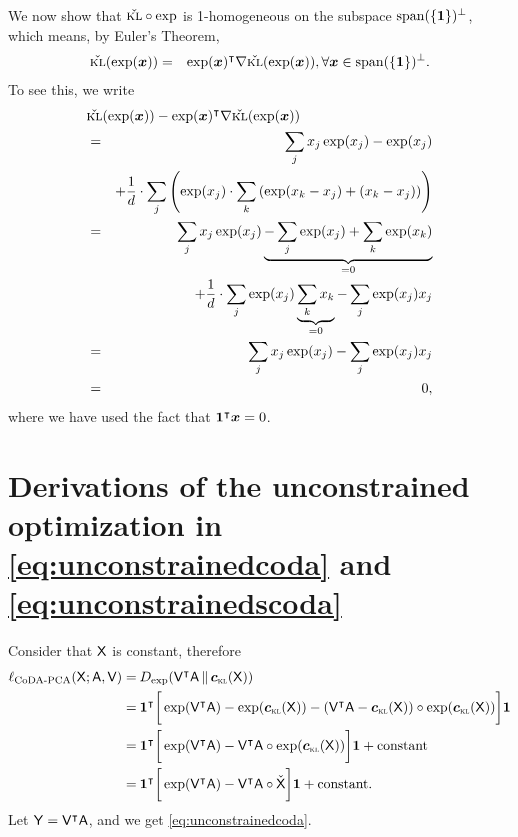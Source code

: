 We now show that $\check{{\textsc{kl}}}
\circ \exp$ is
1-homogeneous on the subspace $\mathrm{span}(\{\bm{1}\})^\bot$, which
means, by Euler's Theorem,
\begin{eqnarray}
\check{{\textsc{kl}}}(\exp(\bm{x})) & = & \exp(\bm{x})^\intercal \nabla
\check{{\textsc{kl}}}(\exp(\bm{x})), \forall \bm{x}\in \mathrm{span}(\{\bm{1}\})^\bot.
\end{eqnarray}
To see this, we write
\begin{eqnarray}
\lefteqn{\check{\kl}(\exp(\ve{x})) - \exp(\ve{x})^\top \nabla \check{\kl}(\exp(\ve{x}))}\nonumber\\
 & = & \sum_j x_j \exp(x_j) -
 \exp(x_j) \nonumber\\
 & & +\frac{1}{d} \cdot \sum_j \left(
   \exp(x_j)\cdot \sum_k \left( \exp(x_k - x_j) + (x_k - x_j)\right) \right) \nonumber\\
 & = & \sum_j x_j \exp(x_j) \underbrace{-
 \sum_j \exp(x_j) + \sum_k  \exp(x_k)}_{=0} \nonumber\\
 & & + \frac{1}{d}\cdot \sum_{j} \exp(x_j) \underbrace{\sum_k x_k}_{=0} - \sum_{j} \exp(x_j) x_j \nonumber\\
 & = & \sum_j x_j \exp(x_j) - \sum_{j} \exp(x_j) x_j \nonumber\\
 & = & 0,
\end{eqnarray}
where we have used the fact that $\bm{1}^\intercal \bm{x} = 0$.

\section{Derivations of the unconstrained optimization in
\eqref{eq:unconstrainedcoda} and \eqref{eq:unconstrainedscoda}}

Consider that $\mathsf{X}$ is constant, therefore
\begin{align*}
\ell_{\mathrm{CoDA\text{-}PCA}}(\X; \A, \V)
=\:& D_{\exp}(\V^\top\A\,\Vert\, \clrlog({\X}))\nonumber\\
=\:&
\bm{1}^\top
\bigg[
\exp(\V^\top\A) - \exp(\clrlog({\X})) - (\V^\top\A - \clrlog({\X}))\circ\exp(\clrlog({\X}))
\bigg]\bm{1}\nonumber\\
=\:&
\bm{1}^\top
\bigg[
\exp(\V^\top\A) - \V^\top\A\circ\exp(\clrlog({\X}))
\bigg]\bm{1} + \mathrm{constant}\nonumber\\
=\:&
\bm{1}^\top
\bigg[
\exp(\V^\top\A) - \V^\top\A\circ\check{\X}
\bigg]\bm{1} + \mathrm{constant}.
\end{align*}
Let $\mathsf{Y}=\mathsf{V}^\intercal\mathsf{A}$, and we get \eqref{eq:unconstrainedcoda}.

